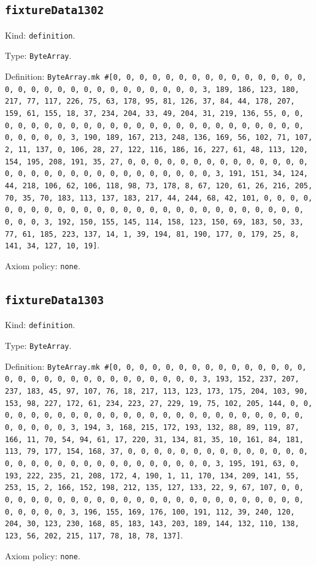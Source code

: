 \documentclass[11pt]{article}
\begin{document}
\subsection*{\texttt{fixtureData1302}}
\noindent Kind: \texttt{definition}.\par
\noindent Type: \texttt{ByteArray}.\par
\noindent Definition: \texttt{ByteArray.mk \#[0, 0, 0, 0, 0, 0, 0, 0, 0, 0, 0, 0, 0, 0, 0, 0, 0, 0, 0, 0, 0, 0, 0, 0, 0, 0, 0, 0, 0, 0, 3, 189, 186, 123, 180, 217, 77, 117, 226, 75, 63, 178, 95, 81, 126, 37, 84, 44, 178, 207, 159, 61, 155, 18, 37, 234, 204, 33, 49, 204, 31, 219, 136, 55, 0, 0, 0, 0, 0, 0, 0, 0, 0, 0, 0, 0, 0, 0, 0, 0, 0, 0, 0, 0, 0, 0, 0, 0, 0, 0, 0, 0, 0, 0, 3, 190, 189, 167, 213, 248, 136, 169, 56, 102, 71, 107, 2, 11, 137, 0, 106, 28, 27, 122, 116, 186, 16, 227, 61, 48, 113, 120, 154, 195, 208, 191, 35, 27, 0, 0, 0, 0, 0, 0, 0, 0, 0, 0, 0, 0, 0, 0, 0, 0, 0, 0, 0, 0, 0, 0, 0, 0, 0, 0, 0, 0, 0, 0, 3, 191, 151, 34, 124, 44, 218, 106, 62, 106, 118, 98, 73, 178, 8, 67, 120, 61, 26, 216, 205, 70, 35, 70, 183, 113, 137, 183, 217, 44, 244, 68, 42, 101, 0, 0, 0, 0, 0, 0, 0, 0, 0, 0, 0, 0, 0, 0, 0, 0, 0, 0, 0, 0, 0, 0, 0, 0, 0, 0, 0, 0, 0, 0, 3, 192, 150, 155, 145, 114, 158, 123, 150, 69, 183, 50, 33, 77, 61, 185, 223, 137, 14, 1, 39, 194, 81, 190, 177, 0, 179, 25, 8, 141, 34, 127, 10, 19]}.\par
\noindent Axiom policy: \texttt{none}.\par
\subsection*{\texttt{fixtureData1303}}
\noindent Kind: \texttt{definition}.\par
\noindent Type: \texttt{ByteArray}.\par
\noindent Definition: \texttt{ByteArray.mk \#[0, 0, 0, 0, 0, 0, 0, 0, 0, 0, 0, 0, 0, 0, 0, 0, 0, 0, 0, 0, 0, 0, 0, 0, 0, 0, 0, 0, 0, 0, 3, 193, 152, 237, 207, 237, 183, 45, 97, 107, 76, 18, 217, 113, 123, 173, 175, 204, 103, 90, 153, 98, 227, 172, 61, 234, 223, 27, 229, 19, 75, 102, 205, 144, 0, 0, 0, 0, 0, 0, 0, 0, 0, 0, 0, 0, 0, 0, 0, 0, 0, 0, 0, 0, 0, 0, 0, 0, 0, 0, 0, 0, 0, 0, 3, 194, 3, 168, 215, 172, 193, 132, 88, 89, 119, 87, 166, 11, 70, 54, 94, 61, 17, 220, 31, 134, 81, 35, 10, 161, 84, 181, 113, 79, 177, 154, 168, 37, 0, 0, 0, 0, 0, 0, 0, 0, 0, 0, 0, 0, 0, 0, 0, 0, 0, 0, 0, 0, 0, 0, 0, 0, 0, 0, 0, 0, 0, 0, 3, 195, 191, 63, 0, 193, 222, 235, 21, 208, 172, 4, 190, 1, 11, 170, 134, 209, 141, 55, 253, 15, 2, 166, 152, 198, 212, 135, 127, 133, 22, 9, 67, 107, 0, 0, 0, 0, 0, 0, 0, 0, 0, 0, 0, 0, 0, 0, 0, 0, 0, 0, 0, 0, 0, 0, 0, 0, 0, 0, 0, 0, 0, 0, 3, 196, 155, 169, 176, 100, 191, 112, 39, 240, 120, 204, 30, 123, 230, 168, 85, 183, 143, 203, 189, 144, 132, 110, 138, 123, 56, 202, 215, 117, 78, 18, 78, 137]}.\par
\noindent Axiom policy: \texttt{none}.\par
\end{document}
